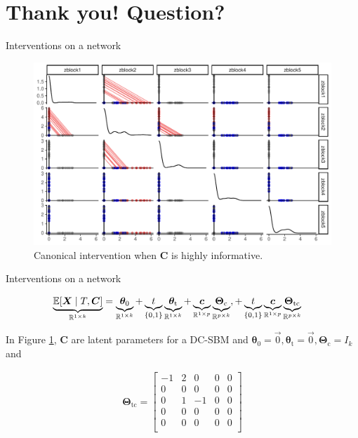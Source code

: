 \documentclass{beamer}
\theoremstyle{remark}
\renewcommand{\c}{\bm c}
\newcommand{\C}{\bm C}
\newcommand{\X}{\bm X}
\newcommand{\thetazero}{\bm \theta_0}
\newcommand{\thetat}{\bm \theta_\text{t}}
\newcommand{\Thetac}{\bm \Theta_\text{c}}
\newcommand{\Thetatc}{\bm \Theta_\text{tc}}
\DeclarePairedDelimiter{\brac}{[}{]}
\newcommand{\E}[2][]{%
   \ifthenelse{ \equal{#1}{} }
      {\ensuremath{\mathbb{E} \brac*{#2}}}
      {\ensuremath{\mathbb{E} \brac*{#2 \mid #1}}}
}
\begin{document}
\section{Thank you! Question?}

\begin{frame}{Interventions on a network}

    \begin{figure}
        \includegraphics[width=\textwidth]{figures/intervention.pdf}
        \caption{Canonical intervention when $\C$ is highly informative.}
        \label{fig:intervention}
    \end{figure}
\end{frame}

\begin{frame}{Interventions on a network}

    \begin{align*}
        \underbrace{\E[T, \C]{\X}}_{\mathbb R^{1 \times k}}
         & = \underbrace{\thetazero}_{\mathbb R^{1 \times k}}
        + \underbrace{t}_{\{0, 1\}} \underbrace{\thetat}_{\mathbb R^{1 \times k}}
        + \underbrace{\c}_{\mathbb R^{1 \times p}} \underbrace{\Thetac}_{\mathbb R^{p \times k}},
        + \underbrace{t}_{\{0, 1\}} \underbrace{\c}_{\mathbb R^{1 \times p}} \underbrace{\Thetatc}_{\mathbb R^{p \times k}}
    \end{align*}

    In Figure \ref{fig:intervention}, $\C$ are latent parameters for a DC-SBM and $\thetazero = \vec 0, \thetat = \vec 0, \Thetac = I_k$ and

    \begin{align*}
        \Thetatc =
        \begin{bmatrix}
            -1 & 2 & 0  & 0 & 0 \\
            0  & 0 & 0  & 0 & 0 \\
            0  & 1 & -1 & 0 & 0 \\
            0  & 0 & 0  & 0 & 0 \\
            0  & 0 & 0  & 0 & 0 \\
        \end{bmatrix}
    \end{align*}
\end{frame}
\end{document}
